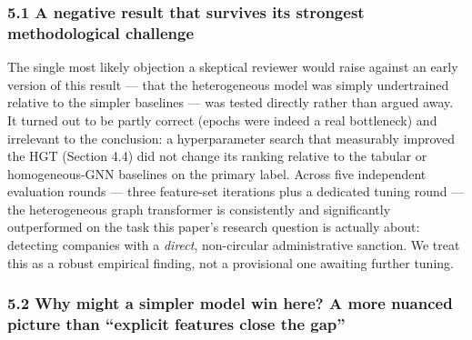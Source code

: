 \documentclass[11pt,]{article}
\begin{document}
\hypertarget{a-negative-result-that-survives-its-strongest-methodological-challenge}{%
\subsubsection{5.1 A negative result that survives its strongest
methodological
challenge}\label{a-negative-result-that-survives-its-strongest-methodological-challenge}}

The single most likely objection a skeptical reviewer would raise
against an early version of this result --- that the heterogeneous model
was simply undertrained relative to the simpler baselines --- was tested
directly rather than argued away. It turned out to be partly correct
(epochs were indeed a real bottleneck) and irrelevant to the conclusion:
a hyperparameter search that measurably improved the HGT (Section 4.4)
did not change its ranking relative to the tabular or homogeneous-GNN
baselines on the primary label. Across five independent evaluation
rounds --- three feature-set iterations plus a dedicated tuning round
--- the heterogeneous graph transformer is consistently and
significantly outperformed on the task this paper's research question is
actually about: detecting companies with a \emph{direct}, non-circular
administrative sanction. We treat this as a robust empirical finding,
not a provisional one awaiting further tuning.

\hypertarget{why-might-a-simpler-model-win-here-a-more-nuanced-picture-than-explicit-features-close-the-gap}{%
\subsubsection{5.2 Why might a simpler model win here? A more nuanced
picture than ``explicit features close the
gap''}\label{why-might-a-simpler-model-win-here-a-more-nuanced-picture-than-explicit-features-close-the-gap}}
\end{document}
